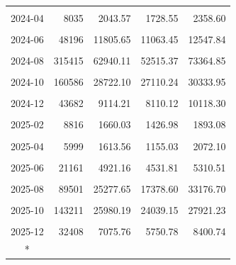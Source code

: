\begin{longtable}[t]{crrrr}
\cellcolor{gray!10}{2024-03} & \cellcolor{gray!10}{16306} & \cellcolor{gray!10}{4004.93} & \cellcolor{gray!10}{3559.23} & \cellcolor{gray!10}{4450.63}\\
2024-04 & 8035 & 2043.57 & 1728.55 & 2358.60\\
\cellcolor{gray!10}{2024-05} & \cellcolor{gray!10}{19669} & \cellcolor{gray!10}{4916.70} & \cellcolor{gray!10}{4559.68} & \cellcolor{gray!10}{5273.73}\\
2024-06 & 48196 & 11805.65 & 11063.45 & 12547.84\\
\cellcolor{gray!10}{2024-07} & \cellcolor{gray!10}{35755} & \cellcolor{gray!10}{11811.77} & \cellcolor{gray!10}{8170.93} & \cellcolor{gray!10}{15452.62}\\
2024-08 & 315415 & 62940.11 & 52515.37 & 73364.85\\
\cellcolor{gray!10}{2024-09} & \cellcolor{gray!10}{342525} & \cellcolor{gray!10}{68494.93} & \cellcolor{gray!10}{64378.96} & \cellcolor{gray!10}{72610.90}\\
2024-10 & 160586 & 28722.10 & 27110.24 & 30333.95\\
\cellcolor{gray!10}{2024-11} & \cellcolor{gray!10}{75577} & \cellcolor{gray!10}{16582.50} & \cellcolor{gray!10}{14659.84} & \cellcolor{gray!10}{18505.16}\\
2024-12 & 43682 & 9114.21 & 8110.12 & 10118.30\\
\cellcolor{gray!10}{2025-01} & \cellcolor{gray!10}{13615} & \cellcolor{gray!10}{2753.50} & \cellcolor{gray!10}{2296.53} & \cellcolor{gray!10}{3210.48}\\
2025-02 & 8816 & 1660.03 & 1426.98 & 1893.08\\
\cellcolor{gray!10}{2025-03} & \cellcolor{gray!10}{10144} & \cellcolor{gray!10}{2484.37} & \cellcolor{gray!10}{2161.52} & \cellcolor{gray!10}{2807.23}\\
2025-04 & 5999 & 1613.56 & 1155.03 & 2072.10\\
\cellcolor{gray!10}{2025-05} & \cellcolor{gray!10}{16707} & \cellcolor{gray!10}{4139.69} & \cellcolor{gray!10}{3847.81} & \cellcolor{gray!10}{4431.56}\\
2025-06 & 21161 & 4921.16 & 4531.81 & 5310.51\\
\cellcolor{gray!10}{2025-07} & \cellcolor{gray!10}{34989} & \cellcolor{gray!10}{11727.41} & \cellcolor{gray!10}{8000.77} & \cellcolor{gray!10}{15454.05}\\
2025-08 & 89501 & 25277.65 & 17378.60 & 33176.70\\
\cellcolor{gray!10}{2025-09} & \cellcolor{gray!10}{147493} & \cellcolor{gray!10}{28003.31} & \cellcolor{gray!10}{22129.30} & \cellcolor{gray!10}{33877.33}\\
2025-10 & 143211 & 25980.19 & 24039.15 & 27921.23\\
\cellcolor{gray!10}{2025-11} & \cellcolor{gray!10}{65739} & \cellcolor{gray!10}{15135.76} & \cellcolor{gray!10}{12849.23} & \cellcolor{gray!10}{17422.28}\\
2025-12 & 32408 & 7075.76 & 5750.78 & 8400.74\\*
\end{longtable}
